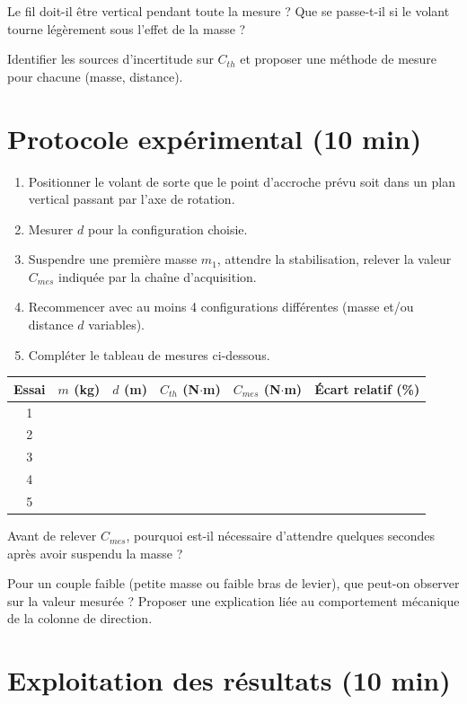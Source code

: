  Le fil doit-il être vertical pendant toute la mesure ? Que se passe-t-il si le volant tourne légèrement sous l'effet de la masse ?
 
 Identifier les sources d'incertitude sur $C_{th}$ et proposer une méthode de mesure pour chacune (masse, distance).
 
\section{Protocole expérimental (10 min)}
 
\begin{enumerate}
\item Positionner le volant de sorte que le point d'accroche prévu soit dans un plan vertical passant par l'axe de rotation.
\item Mesurer $d$ pour la configuration choisie.
\item Suspendre une première masse $m_1$, attendre la stabilisation, relever la valeur $C_{mes}$ indiquée par la chaîne d'acquisition.
\item Recommencer avec au moins 4 configurations différentes (masse et/ou distance $d$ variables).
\item Compléter le tableau de mesures ci-dessous.
\end{enumerate}
 
\vspace{0.5em}
\begin{center}
\begin{tabular}{cccccc}
\hline
Essai & $m$ (kg) & $d$ (m) & $C_{th}$ (N$\cdot$m) & $C_{mes}$ (N$\cdot$m) & Écart relatif (\%) \\
\hline
1 & & & & & \\
2 & & & & & \\
3 & & & & & \\
4 & & & & & \\
5 & & & & & \\
\hline
\end{tabular}
\end{center}
 
 Avant de relever $C_{mes}$, pourquoi est-il nécessaire d'attendre quelques secondes après avoir suspendu la masse ?
 
 Pour un couple faible (petite masse ou faible bras de levier), que peut-on observer sur la valeur mesurée ? Proposer une explication liée au comportement mécanique de la colonne de direction.
 
\section{Exploitation des résultats (10 min)}
 
